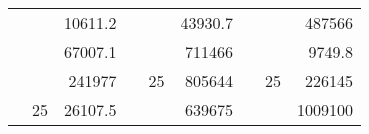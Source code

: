 \begin{table}[]
\begin{tabular}{|ccrccrccc}
\rowcolor[HTML]{DAE8FC} 
\multicolumn{1}{|c|}{\cellcolor[HTML]{FFFFC7}}                                & \multicolumn{1}{c|}{\cellcolor[HTML]{DAE8FC}}                      & \multicolumn{1}{r|}{\cellcolor[HTML]{DAE8FC}10611.2}   & \multicolumn{1}{c|}{\cellcolor[HTML]{FFFFC7}}                                & \multicolumn{1}{c|}{\cellcolor[HTML]{DAE8FC}}                       & \multicolumn{1}{r|}{\cellcolor[HTML]{DAE8FC}43930.7}   & \multicolumn{1}{c|}{\cellcolor[HTML]{FFFFC7}}                                & \multicolumn{1}{c|}{\cellcolor[HTML]{DAE8FC}}                      & \multicolumn{1}{r|}{\cellcolor[HTML]{DAE8FC}487566}    \\ \cline{3-3} \cline{6-6} \cline{9-9} 
\multicolumn{1}{|c|}{\cellcolor[HTML]{FFFFC7}}                                & \multicolumn{1}{c|}{\cellcolor[HTML]{DAE8FC}}                      & \multicolumn{1}{r|}{\cellcolor[HTML]{DDFDFF}67007.1}   & \multicolumn{1}{c|}{\cellcolor[HTML]{FFFFC7}}                                & \multicolumn{1}{c|}{\cellcolor[HTML]{DAE8FC}}                       & \multicolumn{1}{r|}{\cellcolor[HTML]{DDFDFF}711466}    & \multicolumn{1}{c|}{\cellcolor[HTML]{FFFFC7}}                                & \multicolumn{1}{c|}{\cellcolor[HTML]{DAE8FC}}                      & \multicolumn{1}{r|}{\cellcolor[HTML]{DDFDFF}9749.8}    \\ \cline{3-3} \cline{6-6} \cline{9-9} 
\rowcolor[HTML]{DAE8FC} 
\multicolumn{1}{|c|}{\cellcolor[HTML]{FFFFC7}}                                & \multicolumn{1}{c|}{\cellcolor[HTML]{DAE8FC}}                      & \multicolumn{1}{r|}{\cellcolor[HTML]{DAE8FC}241977}    & \multicolumn{1}{c|}{\cellcolor[HTML]{FFFFC7}}                                & \multicolumn{1}{c|}{\multirow{-9}{*}{\cellcolor[HTML]{DAE8FC}25}}   & \multicolumn{1}{r|}{\cellcolor[HTML]{DAE8FC}805644}    & \multicolumn{1}{c|}{\cellcolor[HTML]{FFFFC7}}                                & \multicolumn{1}{c|}{\multirow{-9}{*}{\cellcolor[HTML]{DAE8FC}25}}  & \multicolumn{1}{r|}{\cellcolor[HTML]{DAE8FC}226145}    \\ \cline{3-3} \cline{5-6} \cline{8-9} 
\multicolumn{1}{|c|}{\cellcolor[HTML]{FFFFC7}}                                & \multicolumn{1}{c|}{\multirow{-10}{*}{\cellcolor[HTML]{DAE8FC}25}} & \multicolumn{1}{r|}{\cellcolor[HTML]{DDFDFF}26107.5}   & \multicolumn{1}{c|}{\cellcolor[HTML]{FFFFC7}}                                & \multicolumn{1}{c|}{\cellcolor[HTML]{DDFDFF}}                       & \multicolumn{1}{r|}{\cellcolor[HTML]{DAE8FC}639675}    & \multicolumn{1}{c|}{\cellcolor[HTML]{FFFFC7}}                                & \multicolumn{1}{c|}{\cellcolor[HTML]{DDFDFF}}                      & \multicolumn{1}{r|}{\cellcolor[HTML]{DAE8FC}1009100}   \\ \cline{2-3} \cline{6-6} \cline{9-9} 

\end{tabular}
\end{table}
